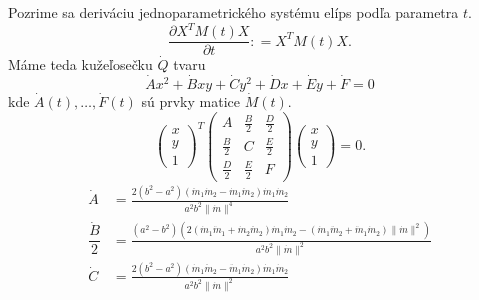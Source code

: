 Pozrime sa deriváciu jednoparametrického systému elíps podľa parametra $t.$ 
$$ \frac{\partial X^TM(t)X}{\partial t} \colon = X^T M(t)X.
$$
Máme teda kužeľosečku $\dot{Q}$ tvaru 
$$
\dot{A}x^2 + \dot{B}xy + \dot{C}y^2 + \dot{D}x + \dot{E}y + \dot{F} = 0$$
kde $\dot{A}(t), \dots, \dot{F}(t)$ sú prvky matice $\dot{M}(t).$
$$
\left(\begin{matrix} x \\ y \\ 1 
\end{matrix} \right)^T \left(\begin{matrix} 
A & \frac{B}{2} & \frac{D}{2} \\
\frac{B}{2} & C & \frac{E}{2} \\
\frac{D}{2} & \frac{E}{2} & F 
\end{matrix} \right)\left(\begin{matrix} x \\ y \\ 1 
\end{matrix} \right) = 0.
$$
\begin{align*}
\dot{A} &= \frac{2 ( b^2 - a^{2}) ( \ddot{m}_{1} \dot{m}_{2} - \dot{m}_{1} \ddot{m}_{2}) \dot{m}_{1} \dot{m}_{2}}{a^{2} b^{2} \|\dot{m} \|^4} \\
\dfrac{\dot{B}}{2} &= \frac{(a^{2} - b^{2}) (2 (\dot{m}_{1} \ddot{m}_{1} + \dot{m}_{2} \ddot{m}_{2}) \dot{m}_{1} \dot{m}_{2} - (\dot{m}_{1} \ddot{m}_{2} + \ddot{m}_{1} \dot{m}_{2}) \|\dot{m} \|^2)}{a^{2} b^{2} \|\dot{m} \|^2} \\
\dot{C} &= \frac{2 (b^2 - a^{2}) ( \dot{m}_{1} \ddot{m}_{2} - \ddot{m}_{1} \dot{m}_{2}) \dot{m}_{1} \dot{m}_{2}}{a^{2} b^{2} \|\dot{m} \|^2} \\
\end{align*}
